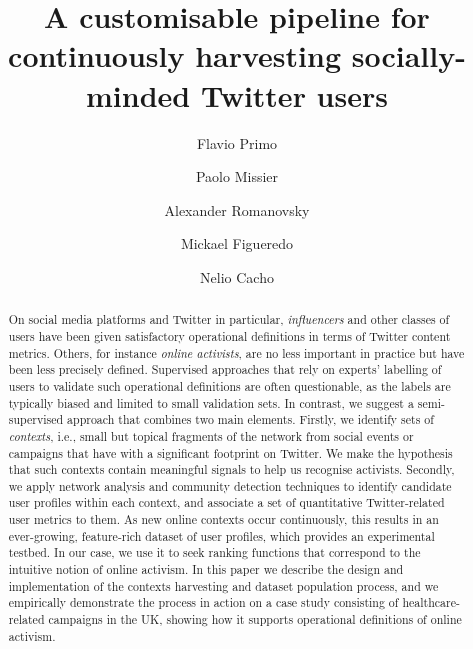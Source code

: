 \documentclass[runningheads]{llncs}
\begin{document}
%
\title{A customisable pipeline for continuously harvesting socially-minded Twitter users}
%
%
\author{Flavio Primo \and
Paolo Missier \and
Alexander Romanovsky \and
Mickael Figueredo \and
Nelio Cacho}

%
%
%
\maketitle       %
%
\begin{abstract}
On social media platforms and Twitter in particular, \textit{influencers} and other classes of users have been given satisfactory operational definitions in terms of Twitter content metrics.
Others, for instance \textit{online activists}, are no less important in practice but have been less precisely defined.
Supervised approaches that rely on experts' labelling of users to validate such operational definitions are often questionable, as the labels are typically biased and limited to small validation sets.
%
In contrast, we suggest a semi-supervised approach that combines two main elements. 
Firstly, we identify sets of \textit{contexts}, i.e., small but topical fragments of the network from social events or campaigns that have with a significant footprint on Twitter.
We make the hypothesis that such contexts contain meaningful signals to help us recognise activists. 
Secondly, we apply network analysis and community detection techniques to identify candidate user profiles within each context, and associate a set of quantitative Twitter-related user metrics to them.
As new online contexts occur continuously, this results in an ever-growing, feature-rich dataset of user profiles, which provides an experimental testbed. In our case, we use it to seek ranking functions that correspond to the intuitive notion of online activism.
In this paper we describe the design and implementation of the contexts harvesting and dataset population process, and we empirically demonstrate the process in action on a case study consisting of healthcare-related campaigns in the UK, showing how it supports operational definitions of online activism.

\end{abstract}
%
\end{document}

